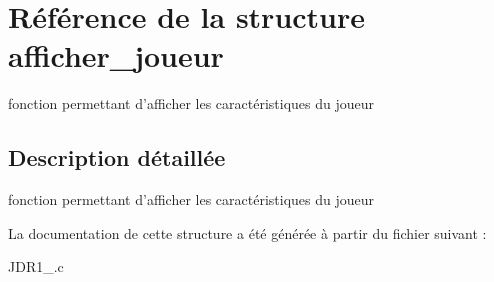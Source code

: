 \hypertarget{structafficher__joueur}{\section{Référence de la structure afficher\-\_\-joueur}
\label{structafficher__joueur}
}


fonction permettant d'afficher les caractéristiques du joueur  




\subsection{Description détaillée}
fonction permettant d'afficher les caractéristiques du joueur 

La documentation de cette structure a été générée à partir du fichier suivant \-:\begin{DoxyCompactItemize}
\item 
J\-D\-R1\-\_.\-c\end{DoxyCompactItemize}
